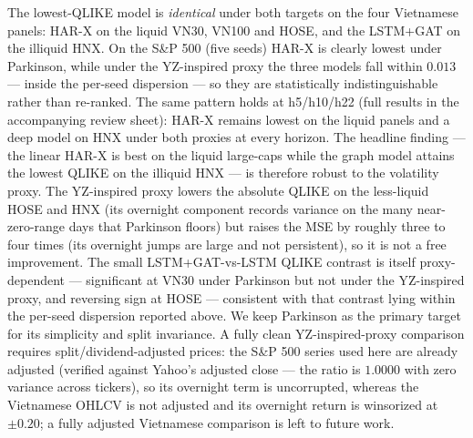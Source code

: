 \documentclass[runningheads]{llncs}
\begin{document}
The lowest-QLIKE model is \emph{identical} under both targets on the four Vietnamese panels: HAR-X on the
liquid VN30, VN100 and HOSE, and the LSTM+GAT on the illiquid HNX. On the S\&P 500 (five seeds) HAR-X is
clearly lowest under Parkinson, while under the YZ-inspired proxy the three models fall within $0.013$ --- inside the
per-seed dispersion --- so they are statistically indistinguishable rather than re-ranked. The same pattern holds at h5/h10/h22 (full results in the accompanying review sheet): HAR-X remains lowest on the liquid panels and a deep model on HNX under both proxies at every horizon. The headline finding --- the linear HAR-X is best on the
liquid large-caps while the graph model attains the lowest QLIKE on the illiquid HNX --- is therefore robust to
the volatility proxy. The YZ-inspired proxy lowers the absolute QLIKE on the less-liquid HOSE and HNX (its
overnight component records variance on the many near-zero-range days that Parkinson floors) but raises the MSE
by roughly three to four times (its overnight jumps are large and not persistent), so it is not a free
improvement. The small LSTM+GAT-vs-LSTM QLIKE contrast is itself proxy-dependent --- significant at VN30 under
Parkinson but not under the YZ-inspired proxy, and reversing sign at HOSE --- consistent with that contrast lying within
the per-seed dispersion reported above. We keep Parkinson as the primary target for its simplicity and split
invariance. A fully clean YZ-inspired-proxy comparison requires split/dividend-adjusted prices: the S\&P 500 series
used here are already adjusted (verified against Yahoo's adjusted close --- the ratio is $1.0000$ with zero
variance across tickers), so its overnight term is uncorrupted, whereas the Vietnamese OHLCV is not adjusted
and its overnight return is winsorized at $\pm0.20$; a fully adjusted Vietnamese comparison is left to future
work.
\end{document}

